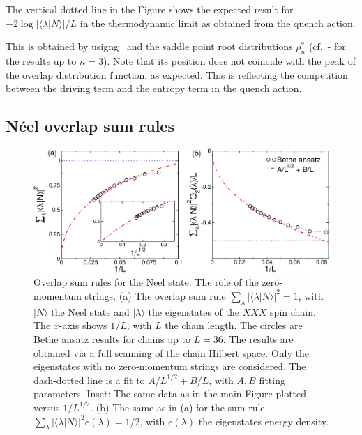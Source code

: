 \documentclass[11pt]{iopart}
\begin{document}
The vertical dotted line in the Figure shows the expected result for 
$-2\log|\langle\lambda|N\rangle|/L$ in the thermodynamic limit as 
obtained from the quench action. 

This is obtained by usigng~ and the saddle point root distributions 
$\rho_n^*$ (cf.~- for the results up to $n=3$). Note that 
its position does not coincide with the peak of the overlap distribution function, as 
expected. This is reflecting the competition between the driving term and the entropy 
term in the quench action. 


\subsection{N\'eel overlap sum rules}
\label{sec:5.2}


\begin{figure}[t]
\begin{center}
\includegraphics[width=.9\textwidth]{./draft_figs/Neel}
\end{center}
\caption{ Overlap sum rules for the Neel state: The role of the zero-momentum 
 strings. (a) The overlap sum rule $\sum_{\lambda}|\langle\lambda|N\rangle|^2=1$, 
 with $|N\rangle$ the Neel state and $|\lambda\rangle$ the eigenstates  of 
 the $XXX$ spin chain. The $x$-axis shows $1/L$, with $L$ the chain length. 
 The circles are Bethe ansatz results for chains up to $L=36$. The results 
 are obtained via a full scanning of the chain Hilbert space. Only the 
 eigenstates with no zero-momentum strings are considered. The dash-dotted 
 line is a fit to $A/L^{1/2}+B/L$, with $A,B$ fitting parameters. Inset: 
 The same data as in the main Figure plotted versus $1/L^{1/2}$. (b) 
 The same as in (a) for the sum rule $\sum_{\lambda}|\langle
 \lambda|N\rangle|^2e(\lambda)=1/2$, with $e(\lambda)$  the 
 eigenstates energy density. 
}
\label{fig1:neel-sr}
\end{figure}
\end{document}
